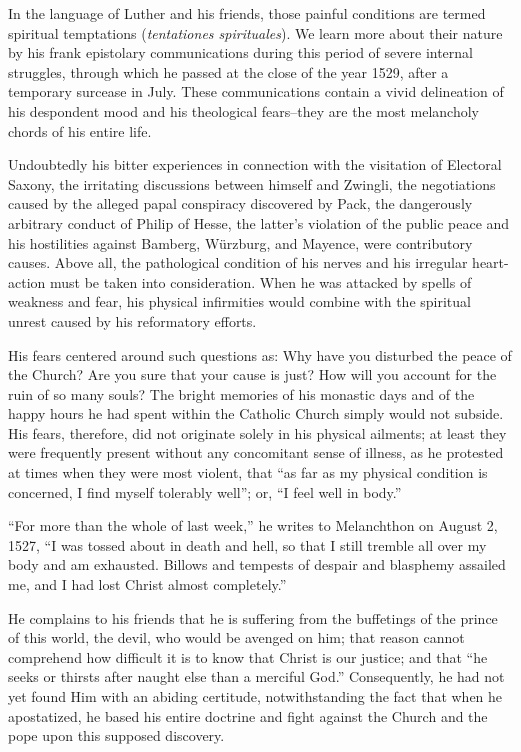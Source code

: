 In the language of Luther and his friends, those painful conditions
are termed spiritual temptations (\textit{tentationes spirituales}). We learn
more about their nature by his frank epistolary communications
during this period of severe internal struggles, through which he passed
at the close of the year 1529, after a temporary surcease in July.
These communications contain a vivid delineation of his despondent
mood and his theological fears--they are the most melancholy chords
of his entire life.

Undoubtedly his bitter experiences in connection with the visitation
of Electoral Saxony, the irritating discussions between himself and
Zwingli, the negotiations caused by the alleged papal conspiracy
discovered by Pack, the dangerously arbitrary conduct of Philip
of Hesse, the latter’s violation of the public peace and his hostilities
against Bamberg, Würzburg, and Mayence, were contributory causes.
Above all, the pathological condition of his nerves and his irregular
heart-action must be taken into consideration. When he was attacked
by spells of weakness and fear, his physical infirmities would
combine with the spiritual unrest caused by his reformatory efforts.

His fears centered around such questions as: Why have you disturbed
the peace of the Church? Are you sure that your cause is just? How
will you account for the ruin of so many souls? The bright memories
of his monastic days and of the happy hours he had spent within the
Catholic Church simply would not subside. His fears, therefore, did
not originate solely in his physical ailments; at least they were frequently
present without any concomitant sense of illness, as he protested
at times when they were most violent, that “as far as my physical
condition is concerned, I find myself tolerably well”; or, “I feel
well in body.”

“For more than the whole of last week,” he writes to Melanchthon
on August 2, 1527, “I was tossed about in death and hell, so that I
still tremble all over my body and am exhausted. Billows and
tempests of despair and blasphemy assailed me, and I had lost Christ
almost completely.”

He complains to his friends that he is suffering from the buffetings of the
prince of this world, the devil, who would be avenged on him; that reason
cannot comprehend how difficult it is to know that Christ is our justice;
and that “he seeks or thirsts after naught else than a merciful God.”
Consequently, he had not yet found Him with an abiding certitude, notwithstanding
the fact that when he apostatized, he based his entire doctrine and fight
against the Church and the pope upon this supposed discovery.

